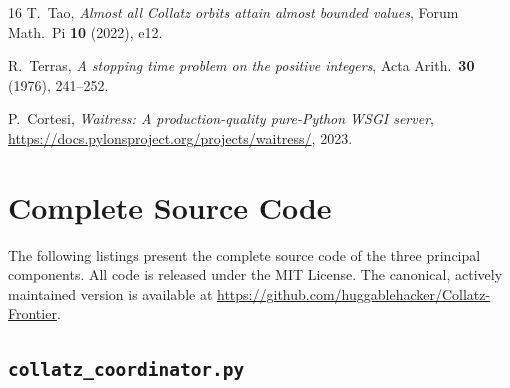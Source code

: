 \documentclass{mcom-l}
\theoremstyle{definition}
\theoremstyle{remark}
\numberwithin{equation}{section}
\begin{document}
\begin{thebibliography}{16}
T.~Tao,
\emph{Almost all Collatz orbits attain almost bounded values},
Forum Math.\ Pi \textbf{10} (2022), e12.

R.~Terras,
\emph{A stopping time problem on the positive integers},
Acta Arith.\ \textbf{30} (1976), 241--252.

P.~Cortesi,
\emph{Waitress: A production-quality pure-Python WSGI server},
\url{https://docs.pylonsproject.org/projects/waitress/}, 2023.

\end{thebibliography}

\appendix
\section{Complete Source Code}
\label{sec:code}

The following listings present the complete source code of the three
principal components.  All code is released under the MIT License.
The canonical, actively maintained version is available at
\url{https://github.com/huggablehacker/Collatz-Frontier}.

\subsection{\texttt{collatz\_coordinator.py}}
\end{document}
